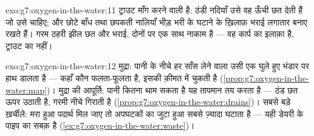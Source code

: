 \begin{solution}{exo:g7:oxygen-in-the-water:11}
ट्राउट माँग करने वाली  है: ठंडी नदियाँ उसे वह ऊँची छत देती हैं
जो उसे चाहिए; और छोटे बाँध तथा छपकती नालियाँ भीड़ भरी  के घटाने
के ख़िलाफ़ भराई लगातार बनाए रखते हैं। गरम ठहरी झील छत और भराई, दोनों पर
एक साथ नाकाम है --- वह कार्प का इलाक़ा है, ट्राउट का नहीं।
\end{solution}

\begin{solution}{exo:g7:oxygen-in-the-water:12}
मुद्रा: पानी के नीचे हर साँस लेने वाला उसी एक घुले हुए भंडार पर हाथ
डालता है --- कहाँ कौन फलता-फूलता है, इसकी क़ीमत  में चुकती है
(\cref{prop:g7:oxygen-in-the-water:map})। मुद्रा की आपूर्ति: पानी कितना
थाम सकता है यह तापमान तय करता है --- ठंड छत ऊपर उठाती है, गरमी नीचे
गिराती है (\cref{prop:g7:oxygen-in-the-water:drains})। सबसे बड़े
ख़र्चीले: मरा हुआ पदार्थ मिल जाए तो अपघटकों का जुटा हुआ  सबसे
ज़्यादा घटाता है --- यही डेयरी के पाइप का सबक़ है
(\cref{ex:g7:oxygen-in-the-water:waste})।
\end{solution}

